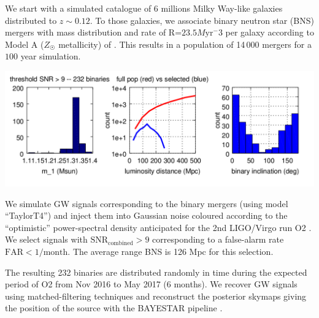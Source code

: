 \documentclass[a0,portrait]{a0poster}
\begin{document}
\begin{multicols}{2}
We start with a simulated catalogue of 6 millions Milky Way-like galaxies
distributed to $z\sim 0.12$. To those galaxies, we associate binary neutron star
(BNS) mergers with mass distribution and rate of R=$23.5 M\mathrm{yr}^-3$ per galaxy
according to Model A ($Z_{\astrosun}$ metallicity) of
\cite{dominik12:_doubl_compac_objec}. This results in a population of 14\,000
mergers for a $100$ year simulation.

\begin{center}\vspace{.5cm}
    \includegraphics[width=30cm]{figures/summary_plot.png}
\end{center}

We simulate GW signals corresponding to the binary mergers (using model
``TaylorT4'') and inject them into Gaussian noise coloured according to the
``optimistic'' power-spectral density anticipated for the 2nd LIGO/Virgo run O2
\cite{lrr-2016-1}. We select signals with $\mathrm{SNR}_{\mathrm{combined}} > 9$
corresponding to a false-alarm rate $\mathrm{FAR} < 1/\mathrm{month}$. The average range
BNS is 126 Mpc for this selection.

The resulting 232 binaries are distributed randomly in time during the expected
period of O2 from Nov 2016 to May 2017 (6 months). We recover GW signals using
matched-filtering techniques and reconstruct the posterior skymaps giving the
position of the source with the BAYESTAR pipeline \cite{PhysRevD.93.024013}.



\end{multicols}
\end{document}

